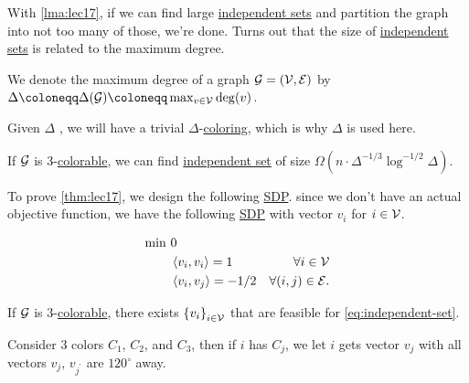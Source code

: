 With \autoref{lma:lec17}, if we can find large \hyperref[def:independent-set]{independent sets} and partition the graph into not too many of those, we're done. Turns out that the size of \hyperref[def:independent-set]{independent sets} is related to the maximum degree.

\begin{notation}
	We denote the maximum degree of a graph \(\mathcal{\MakeUppercase{g}}=(\mathcal{\MakeUppercase{v}} , \mathcal{\MakeUppercase{e}} ) \) by \(\Delta \coloneqq \Delta (\mathcal{\MakeUppercase{G}} )\coloneqq \max_{v\in \mathcal{\MakeUppercase{v}} } \deg(v)\).
\end{notation}

Given \(\Delta \) , we will have a trivial \(\Delta \)-\hyperref[def:coloring]{coloring}, which is why \(\Delta \) is used here.

\begin{theorem}\label{thm:lec17}
	If \(\mathcal{\MakeUppercase{g}} \) is \(3\)-\hyperref[def:coloring]{colorable}, we can find \hyperref[def:independent-set]{independent set} of size \(\Omega (n\cdot \Delta ^{-1 / 3}\log^{-1 / 2} \Delta )\).
\end{theorem}

To prove \autoref{thm:lec17}, we design the following \hyperref[eq:independent-set]{SDP}. since we don't have an actual objective function, we have the following \hyperref[def:SDP]{SDP} with vector \(v_i\) for \(i\in \mathcal{\MakeUppercase{v}} \).

\begin{equation}\label{eq:independent-set}
	\begin{aligned}
		\min~ & 0                                                                                             \\
		      & \left\langle v_i, v_i \right\rangle = 1      & \forall i\in \mathcal{\MakeUppercase{v}}       \\
		      & \left\langle v_i, v_j \right\rangle = -1 / 2 & \forall (i, j)\in \mathcal{\MakeUppercase{e}}.
	\end{aligned}
\end{equation}
\begin{claim}
	If \(\mathcal{\MakeUppercase{g}} \) is \(3\)-\hyperref[def:coloring]{colorable}, there exists \(\left\{ v_i \right\}_{i\in \mathcal{\MakeUppercase{v}} } \) that are feasible for \autoref{eq:independent-set}.
\end{claim}
\begin{explanation}
	Consider \(3\) colors \(C_1\), \(C_2\), and \(C_3\), then if \(i\) has \(C_j\), we let \(i\) gets vector \(v_j\) with all vectors \(v_j\), \(v_{j^\prime }\) are \(120^{\circ } \) away.
	\begin{center}
	\end{center}
\end{explanation}

